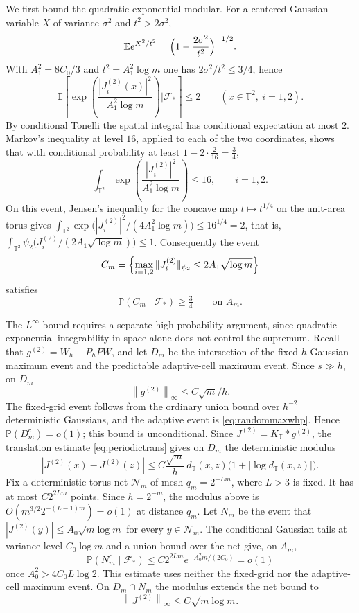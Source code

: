 \documentclass[11pt]{article}
\theoremstyle{definition}
\theoremstyle{remark}
\numberwithin{equation}{section}
\newcommand{\T}{\mathbb T}
\newcommand{\E}{\mathbb E}
\newcommand{\F}{\mathcal F}
\newcommand{\norm}[1]{\left\|#1\right\|}
\begin{document}
We first bound the quadratic exponential modular. For a centered
Gaussian variable $X$ of variance $\sigma^2$ and $t^2>2\sigma^2$,
\[
 \E e^{X^2/t^2}=\Bigl(1-\frac{2\sigma^2}{t^2}\Bigr)^{-1/2}.
\]
With $A_1^2=8C_0/3$ and $t^2=A_1^2\log m$ one has
$2\sigma^2/t^2\le3/4$, hence
\[
 \E\left[\exp\left(\frac{|J^{(2)}_i(x)|^2}
                    {A_1^2\log m}\right)\Big|\F_*\right]\le2
 \qquad(x\in\T^2,\ i=1,2).
\]
By conditional Tonelli the spatial integral has conditional
expectation at most $2$. Markov's inequality at level $16$, applied
to each of the two coordinates, shows that with conditional
probability at least $1-2\cdot\frac2{16}=\frac34$,
\[
 \int_{\T^2}\exp\left(\frac{|J^{(2)}_i|^2}{A_1^2\log m}\right)\le16,
 \qquad i=1,2.
\]
On this event, Jensen's inequality for the concave map
$t\mapsto t^{1/4}$ on the unit-area torus gives
$\int_{\T^2}\exp\bigl(|J^{(2)}_i|^2/(4A_1^2\log m)\bigr)\le16^{1/4}=2$,
that is, $\int_{\T^2}\psi_2\bigl(J^{(2)}_i/(2A_1\sqrt{\log m})\bigr)\le1$.
Consequently the event
\[
 C_m=\Bigl\{\max_{i=1,2}\|J_i^{(2)}\|_{\psi_2}
             \le 2A_1\sqrt{\log m}\Bigr\}
\]
satisfies
\begin{equation}\label{eq:ps2corr}
 \mathbb P(C_m\mid\mathcal F_*)\ge\tfrac34
 \qquad\text{on }A_m.
\end{equation}

The $L^\infty$ bound requires a separate high-probability argument,
since quadratic exponential integrability in space alone does not
control the supremum. Recall that $g^{(2)}=W_h-P_hPW$, and let $D_m$
be the intersection of the fixed-$h$ Gaussian maximum event and the
predictable adaptive-cell maximum event. Since $s\gg h$, on $D_m$
\[
 \norm{g^{(2)}}_\infty\le C\sqrt m/h.
\]
The fixed-grid event follows from the ordinary union bound over
$h^{-2}$ deterministic Gaussians, and the adaptive event is
\eqref{eq:randommaxwhp}. Hence $\mathbb P(D_m^c)=o(1)$; this bound is unconditional.
Since $J^{(2)}=K_{\T}*g^{(2)}$, the translation estimate
\eqref{eq:periodictrans} gives on $D_m$ the deterministic modulus
\[
 |J^{(2)}(x)-J^{(2)}(z)|
 \le C\frac{\sqrt m}{h}\,d_{\T}(x,z)
             \bigl(1+|\log d_{\T}(x,z)|\bigr).
\]
Fix a deterministic torus net $\mathcal N_m$ of mesh $q_m=2^{-Lm}$,
where $L>3$ is fixed. It has at most $C2^{2Lm}$ points. Since
$h=2^{-m}$, the modulus above is $O(m^{3/2}2^{-(L-1)m})=o(1)$ at
distance $q_m$. Let $N_m$ be the event that
$|J^{(2)}(y)|\le A_0\sqrt{m\log m}$ for every $y\in\mathcal N_m$.
The conditional Gaussian tails at variance level $C_0\log m$ and a
union bound over the net give, on $A_m$,
\[
 \mathbb P(N_m^c\mid\mathcal F_*)
 \le C2^{2Lm}e^{-A_0^2m/(2C_0)}=o(1)
\]
once $A_0^2>4C_0L\log2$. This estimate uses neither the fixed-grid
nor the adaptive-cell maximum event. On $D_m\cap N_m$ the modulus
extends the net bound to
\begin{equation}\label{eq:supcorr}
 \norm{J^{(2)}}_\infty\le C\sqrt{m\log m}.
\end{equation}
\end{document}
